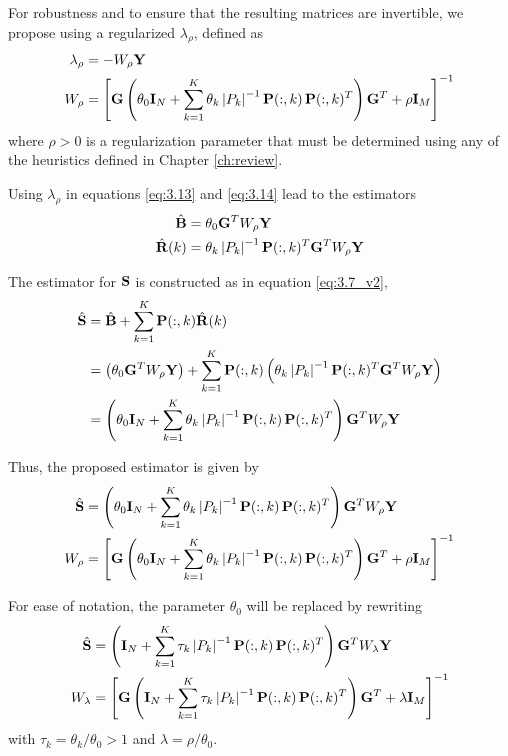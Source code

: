 For robustness and to ensure that the resulting matrices are invertible, we propose using a regularized $\lambda_\rho$, defined as
\begin{align}
    \lambda_\rho &= -W_\rho  \mathbf{Y} 
    \\
    W_\rho &=
    \left[ \mathbf{G} \left(  \theta_0 \mathbf{I}_N + \sum_{k=1}^K \theta_k \left| {P_k} \right|^{-1} 
    \mathbf{P}(:,k)\, \mathbf{P}(:,k)^T
     \right) \mathbf{G}^T + \rho \mathbf{I}_M  \right]^{-1}
\end{align}
where $\rho>0$ is a regularization parameter that must be determined using any of the heuristics defined in Chapter \ref{ch:review}.

Using $\lambda_\rho$ in equations \eqref{eq:3.13} and \eqref{eq:3.14} lead to the estimators
\begin{align}
    \hat{\mathbf{B}} &=
    \theta_0 \mathbf{G}^T W_\rho \mathbf{Y}
    \\
    \hat{\mathbf{R}}(k) &=
    \theta_k \left| {P_k} \right|^{-1} \mathbf{P}(:,k)^T \mathbf{G}^T W_\rho \mathbf{Y}
\end{align}

The estimator for $\mathbf{S}$ is constructed as in equation \eqref{eq:3.7_v2},
\begin{align}
    \hat{\mathbf{S}}
    &=
    \hat{\mathbf{B}} + \sum_{k=1}^K \mathbf{P}(:,k) \hat{\mathbf{R}}(k)
    \nonumber \\
    &=
    \left( \theta_0 \mathbf{G}^T W_\rho \mathbf{Y} \right)
    + \sum_{k=1}^K \mathbf{P}(:,k) \left( \theta_k \left| {P_k} \right|^{-1} \mathbf{P}(:,k)^T \mathbf{G}^T W_\rho \mathbf{Y} \right)
    \nonumber \\
    &=
    \left(  \theta_0 \mathbf{I}_N + \sum_{k=1}^K \theta_k \left| {P_k} \right|^{-1} 
    \mathbf{P}(:,k)\, \mathbf{P}(:,k)^T
     \right) \mathbf{G}^T W_\rho \mathbf{Y}
\end{align}

Thus, the proposed estimator is given by
\begin{align}
    \hat{\mathbf{S}}
    &=
    \left(  \theta_0 \mathbf{I}_N + \sum_{k=1}^K \theta_k \left| {P_k} \right|^{-1} 
    \mathbf{P}(:,k)\, \mathbf{P}(:,k)^T
     \right) \mathbf{G}^T W_\rho \mathbf{Y}
    \\
    W_\rho &=
    \left[ \mathbf{G} \left(  \theta_0 \mathbf{I}_N + \sum_{k=1}^K \theta_k \left| {P_k} \right|^{-1} 
    \mathbf{P}(:,k)\, \mathbf{P}(:,k)^T
     \right) \mathbf{G}^T + \rho \mathbf{I}_M  \right]^{-1}
\end{align}

For ease of notation, the parameter $\theta_0$ will be replaced by rewriting
\begin{align}
    \hat{\mathbf{S}}
    &=
    \left(  \mathbf{I}_N + \sum_{k=1}^K \tau_k \left| {P_k} \right|^{-1} 
    \mathbf{P}(:,k)\, \mathbf{P}(:,k)^T
     \right) \mathbf{G}^T W_\lambda \mathbf{Y}
    \label{eq:3.24}
    \\
    W_\lambda &=
    \left[ \mathbf{G} \left(  \mathbf{I}_N + \sum_{k=1}^K \tau_k \left| {P_k} \right|^{-1} 
    \mathbf{P}(:,k)\, \mathbf{P}(:,k)^T
     \right) \mathbf{G}^T + \lambda \mathbf{I}_M  \right]^{-1}
    \label{eq:3.25}
\end{align}
with $\tau_k = \theta_k/\theta_0 > 1$ and $\lambda=\rho/\theta_0$.

